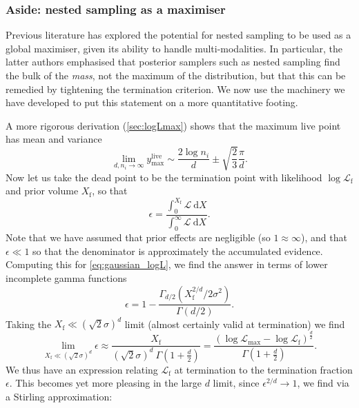 \documentclass[usenatbib]{mnras}
\newcommand{\nlive}{n_i}
\newcommand{\Like}{\mathcal{L}}
\begin{document}
\subsubsection*{Aside: nested sampling as a maximiser}
Previous literature \citep{Akrami_2010, Feroz_2011} has explored the potential for nested sampling to be used as a global maximiser, given its ability to handle multi-modalities. In particular, the latter authors emphasised that posterior samplers such as nested sampling find the bulk of the \textit{mass}, not the maximum of the distribution, but that this can be remedied by tightening the termination criterion. We now use the machinery we have developed to put this statement on a more quantitative footing. 
\par
A more rigorous derivation (\cref{sec:logLmax}) shows that the maximum live point has mean and variance
\begin{equation}\label{eq:ylivemax}
	\lim_{d,\nlive\to\infty} y_\mathrm{max}^\mathrm{live} \sim \frac{2\log \nlive}{d} \pm \sqrt{\frac{2}{3}}\frac{\pi}{d}.
\end{equation}
Now let us take the dead point to be the termination point with likelihood $\log\Like_\mathrm{f}$ and prior volume $X_\mathrm{f}$, so that
\begin{equation}
	\epsilon = \frac{\int_0^{X_\mathrm{f}} \mathcal{L}\ \mathrm{d}X}{\int_0^\infty \mathcal{L}\ \mathrm{d}X}.
\end{equation}
Note that we have assumed that prior effects are negligible (so $1\approx \infty$), and that $\epsilon \ll 1$ so that the denominator is approximately the accumulated evidence. Computing this for \eqref{eq:gaussian_logL}, we find the answer in terms of lower incomplete gamma functions
\begin{equation}
\epsilon = 1- \frac{\Gamma_{d/2}\left(X_\mathrm{f}^{2/d}/2\sigma^2\right)}{\Gamma(d/2)}.
\end{equation}
Taking the $X_\mathrm{f}\ll (\sqrt{2}\sigma)^d$ limit (almost certainly valid at termination) we find
\begin{equation}
    \lim_{X_\mathrm{f}\ll (\sqrt{2}\sigma)^d} \epsilon \approx \frac{X_\mathrm{f}}{(\sqrt{2}\sigma)^d \ \Gamma\left(1+\frac{d}{2}\right)} = \frac{(\log\mathcal{L}_\mathrm{max}-\log\mathcal{L}_\mathrm{f})^{\frac{d}{2}}}{\Gamma\left(1+\frac{d}{2}\right)}.
\end{equation}
We thus have an expression relating $\mathcal{L}_\mathrm{f}$ at termination to the termination fraction $\epsilon$. This becomes yet more pleasing in the large $d$ limit, since $\epsilon^{2/d}\to 1$, we find via a Stirling approximation:
\end{document}
